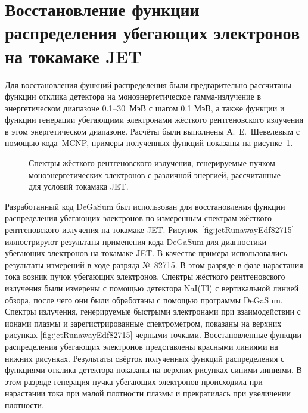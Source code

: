\section{Восстановление функции распределения убегающих электронов на токамаке JET}

Для восстановления функций распределения были предварительно рассчитаны функции отклика детектора на моноэнергетическое гамма-излучение в энергетическом диапазоне 0.1--30~МэВ с шагом 0.1 МэВ, а также функции и функции генерации убегающими электронами жёсткого рентгеновского излучения в этом энергетическом диапазоне. Расчёты были выполнены А.~Е.~Шевелевым с помощью кода~MCNP, примеры полученных функций показаны на рисунке~\ref{fig:jetGenerationFunctions}. 

\begin{figure}[ht!]
  \caption{ Спектры жёсткого рентгеновского излучения, генерируемые пучком моноэнергетических электронов с различной энергией, рассчитанные для условий токамака JET.~\cite{Shevelev2013} }
  \label{fig:jetGenerationFunctions}
\end{figure}


Разработанный код DeGaSum был использован для восстановления функции распределения убегающих электронов по измеренным спектрам жёсткого рентгеновского излучения на токамаке JET. Рисунок~\ref{fig:jetRunawayEdf82715} иллюстрируют результаты применения кода DeGaSum для диагностики убегающих электронов на токамаке JET. В качестве примера использовались результаты измерений в ходе разряда №~82715. В этом разряде в фазе нарастания тока возник пучок убегающих электронов. Спектры жёсткого рентгеновского излучения были измерены с помощью детектора NaI(Tl) с вертикальной линией обзора, после чего они были обработаны с помощью программы DeGaSum. Спектры излучения, генерируемые быстрыми электронами при взаимодействии с ионами плазмы и зарегистрированные спектрометром, показаны на верхних рисунках \ref{fig:jetRunawayEdf82715} черными точками. Восстановленные функции распределения убегающих электронов представлены красными линиями на нижних рисунках. Результаты свёрток полученных функций распределения с функциями отклика детектора показаны на верхних рисунках синими линиями. В этом разряде генерация пучка убегающих электронов происходила при нарастании тока при малой плотности плазмы и прекратилась при увеличении плотности.~\cite{Shevelev2013} 

